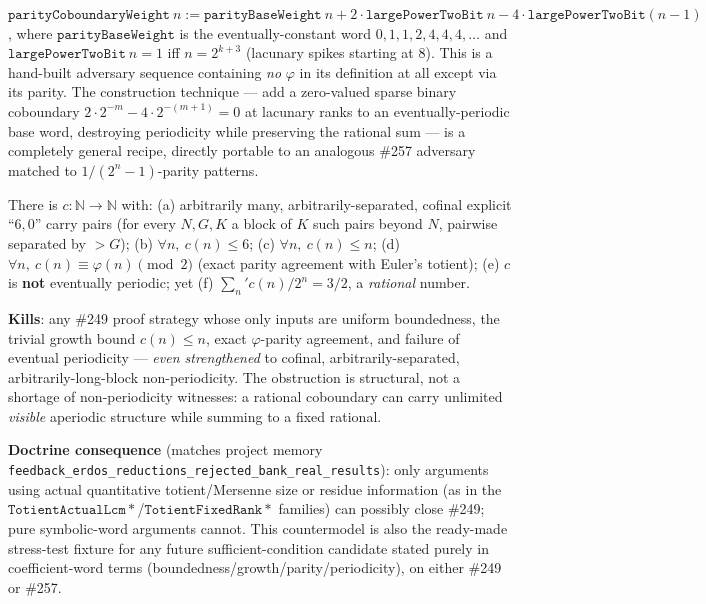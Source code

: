\begin{obs}\label{prop:CM-01}
$\mathtt{parityCoboundaryWeight}\ n := \mathtt{parityBaseWeight}\ n + 2\cdot\mathtt{largePowerTwoBit}\ n - 4\cdot\mathtt{largePowerTwoBit}(n{-}1)$,
where $\mathtt{parityBaseWeight}$ is the eventually-constant word $0,1,1,2,4,4,4,\dots$ and
$\mathtt{largePowerTwoBit}\ n=1$ iff $n=2^{k+3}$ (lacunary spikes starting at $8$). This is a
hand-built adversary sequence containing \emph{no} $\varphi$ in its definition at all except via
its parity. The construction technique — add a zero-valued sparse binary coboundary
$2\cdot2^{-m}-4\cdot2^{-(m+1)}=0$ at lacunary ranks to an eventually-periodic base word, destroying
periodicity while preserving the rational sum — is a completely general recipe, directly portable
to an analogous \#257 adversary matched to $1/(2^n-1)$-parity patterns.
\ \ \\
\end{obs}

\begin{obs}\label{prop:CM-02}
There is $c{:}\mathbb N\to\mathbb N$ with: (a) arbitrarily many, arbitrarily-separated, cofinal
explicit ``$6,0$'' carry pairs (for every $N,G,K$ a block of $K$ such pairs beyond $N$, pairwise
separated by $>G$); (b) $\forall n,\ c(n)\le6$; (c) $\forall n,\ c(n)\le n$; (d) $\forall n,\ c(n)\equiv\varphi(n)\pmod2$
(exact parity agreement with Euler's totient); (e) $c$ is \textbf{not} eventually periodic; yet
(f) $\sum_n' c(n)/2^n = 3/2$, a \emph{rational} number.

\par\medskip

\textbf{Kills}: any \#249 proof strategy
whose only inputs are uniform boundedness, the trivial growth bound $c(n)\le n$, exact
$\varphi$-parity agreement, and failure of eventual periodicity — \emph{even strengthened} to
cofinal, arbitrarily-separated, arbitrarily-long-block non-periodicity. The obstruction is
structural, not a shortage of non-periodicity witnesses: a rational coboundary can carry unlimited
\emph{visible} aperiodic structure while summing to a fixed rational.

\par\medskip

\textbf{Doctrine consequence}
(matches project memory \texttt{feedback\_erdos\_reductions\_rejected\_bank\_real\_results}): only
arguments using actual quantitative totient/Mersenne size or residue information (as in the
$\mathtt{TotientActualLcm}\ast$/$\mathtt{TotientFixedRank}\ast$ families) can possibly close \#249;
pure symbolic-word arguments cannot. This countermodel is also the ready-made stress-test fixture
for any future sufficient-condition candidate stated purely in coefficient-word terms
(boundedness/growth/parity/periodicity), on either \#249 or \#257.
\ \ \\
\end{obs}


